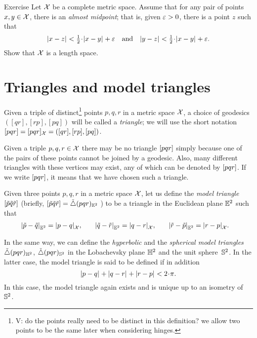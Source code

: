 \begin{thm}{Exercise}\label{ex:menger}
Let $\mathcal{X}$ be a complete metric space.
Assume that for any pair of points $x,y\in \mathcal{X}$, 
there is an \emph{almost midpoint};
that is, given $\varepsilon>0$, there is a point $z$ such that 
\[\dist{x}{z}{}<\tfrac12\cdot\dist{x}{y}{}+\eps 
\quad\text{and}\quad
\dist{y}{z}{}<\tfrac12\cdot\dist{x}{y}{}+\eps.\]
Show that $\mathcal{X}$ is a length space.
\end{thm}


\section{Triangles and model triangles}

Given a triple of distinct\footnote{ \red V: do the points really need to be distinct in this definition? we allow two points to be the same later when considering hinges.} points $p,q,r$ in a metric space $\mathcal{X}$, a choice of geodesics $([q r], [r p], [p q])$ will be called a \emph{triangle}; we will use the short notation 
$[pqr]=[pqr]_{\mathcal{X}}=([q r], [r p], [p q])$.

Given a triple $p,q,r\in \mathcal{X}$ there may be no triangle 
$[pqr]$ simply because one of the pairs of these points cannot be joined by a geodesic.
Also, many different triangles with these vertices may exist, any of which can be denoted by $[pqr]$.
If we write $[pqr]$, it means that we have chosen such a triangle.


Given three points $p,q,r$ in a metric space $\mathcal{X}$,
let us define the \emph{model triangle} $[\tilde p\tilde q\tilde r]$ 
(briefly, 
$[\tilde p\tilde q\tilde r]=\tilde\triangle(p q r)_{\mathbb{E}^2}$%
) to be a triangle in the Euclidean plane $\mathbb{E}^2$ such that
\begin{align*}|{\tilde p}-{\tilde q}|_{\mathbb{E}^2}^{{}}&=|{p}-{q}|_{\mathcal{X}}^{{}},
&
\quad|{\tilde q}-{\tilde r}|_{\mathbb{E}^2}^{{}}&=|{q}-{r}|_{\mathcal{X}}^{{}},
&
\quad|{\tilde r}-{\tilde p}|_{\mathbb{E}^2}^{{}}&=|{r}-{p}|_{\mathcal{X}}^{{}}.
\end{align*}

In the same way, we can define the \emph{hyperbolic} and the \emph{spherical model triangles} $\tilde\triangle(p q r)_{\mathbb{H}^2}$, $\tilde\triangle(p q r)_{\mathbb{S}^2}$
in the Lobachevsky plane $\mathbb{H}^2$ and the unit sphere~$\mathbb{S}^2$.
In the latter case, the model triangle is said to be defined if in addition
\[\dist{p}{q}{}+\dist{q}{r}{}+\dist{r}{p}{}< 2\cdot\pi.\]
In this case, the model triangle again exists and is unique up to an isometry of~$\mathbb{S}^2$.

